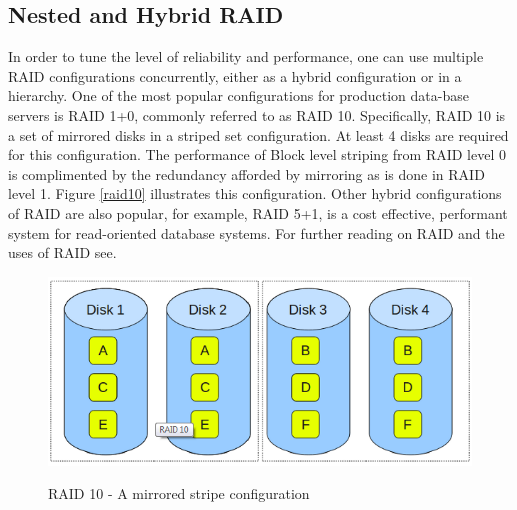 \documentclass[10pt,a4paper]{article}
\begin{document}
\subsection{Nested and Hybrid RAID}
In order to tune the level of reliability and performance, one can use multiple RAID configurations concurrently, either as a hybrid configuration or in a hierarchy. One of the most popular configurations for production data-base servers is RAID 1+0, commonly referred to as RAID 10. Specifically, RAID 10 is a set of mirrored disks in a striped set configuration. At least 4 disks are required for this configuration. The performance of Block level striping from RAID level 0 is complimented by the redundancy afforded by mirroring as is done in RAID level 1. Figure \ref{raid10} illustrates this configuration. Other hybrid configurations of RAID are also popular, for example, RAID 5+1, is a cost effective, performant system for read-oriented database systems. For further reading on RAID and the uses of RAID see. 
\begin{figure}
\caption{RAID 10 - A mirrored stripe configuration \cite{GEEKSRAID}}
\begin{center}
\includegraphics[scale=0.45]{../images/raid10.png}
\label{memory-h}
\end{center}
\end{figure}
\end{document}
